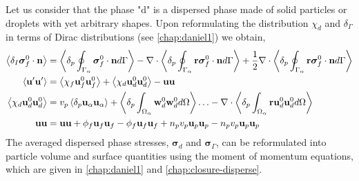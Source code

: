 Let us consider that the phase "d" is a dispersed phase made of solid particles or droplets with yet arbitrary shapes. 
Upon reformulating the distribution $\chi_d$ and $\delta_\Gamma$ in terms of Dirac distributions (see \ref{chap:daniel1}) we obtain, 
\begin{align}
    \left<\delta_I \bm{\sigma}_f^0 \cdot \textbf{n}\right> 
    &= 
    \left<\delta_p \oint_{\Gamma_{\alpha}} \bm{\sigma}_f^0 \cdot \textbf{n} d\Gamma\right> 
    -\mathbf{\nabla}\cdot \left<\delta_p \oint_{\Gamma_{\alpha}} \textbf{r}\bm{\sigma}_f^0 \cdot \textbf{n} d\Gamma\right> 
    + \frac{1}{2}\mathbf{\nabla}\cdot \left<\delta_p \oint_{\Gamma_{\alpha}} \textbf{r}\bm{\sigma}_f^0 \cdot \textbf{n} d\Gamma\right> \\
    \left< \textbf{u}'\textbf{u}'\right>
    &= 
    \left<\chi_f \textbf{u}^0_f\textbf{u}^0_f\right>
    + \left<\chi_d \textbf{u}^0_d\textbf{u}^0_d\right>
    - \textbf{uu}\\
    \left<\chi_d \textbf{u}^0_d\textbf{u}^0_d\right>
    &= 
    v_p\left<\delta_p \textbf{u}_\alpha\textbf{u}_\alpha\right>
    + \left<\delta_p \int_{\Omega_{\alpha}} \textbf{w}_d^0\textbf{w}^0_d d\Omega\right> \ldots
    -\mathbf{\nabla}\cdot \left<\delta_p \int_{\Omega_{\alpha}} \textbf{r}\textbf{u}^0_d\textbf{u}^0_d d\Omega\right>\\
    \textbf{uu} 
    &= 
    \textbf{uu} 
    + \phi_f \textbf{u}_f \textbf{u}_f
    - \phi_f \textbf{u}_f \textbf{u}_f
    + n_pv_p\textbf{u}_p \textbf{u}_p
    - n_pv_p\textbf{u}_p \textbf{u}_p
\end{align}
The averaged dispersed phase stresses, $\bm\sigma_d$ and $\bm\sigma_\Gamma$, can be reformulated into particle volume and surface quantities using the moment of momentum equations, which are given in \ref{chap:daniel1} and \ref{chap:closure-disperse}. 
